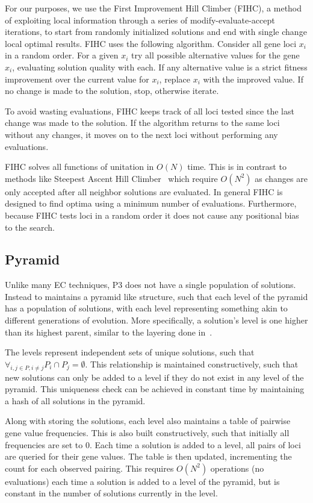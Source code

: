 \documentclass{sig-alternate}
\begin{document}
For our purposes, we use the First Improvement Hill Climber (FIHC), a method of exploiting
local information through a series of modify-evaluate-accept iterations, to start
from randomly initialized solutions and end with single change local optimal results.
FIHC uses the following algorithm.  Consider all gene loci $x_i$ in a random order.
For a given $x_i$ try all possible alternative values for the gene $x_i$, evaluating
solution quality with each.  If any alternative value is a strict fitness improvement
over the current value for $x_i$, replace $x_i$ with the improved value.  If no
change is made to the solution, stop, otherwise iterate.

To avoid wasting evaluations, FIHC keeps track of all loci tested since the last
change was made to the solution.  If the algorithm returns to the same loci without
any changes, it moves on to the next loci without performing any evaluations.

FIHC solves all functions of unitation in $O(N)$ time.  This is in contrast to
methods like Steepest Ascent Hill Climber~\cite{bosman:2011:lsbbo, goldman:2012:ltga}
which require $O(N^2)$ as changes are only accepted after all neighbor solutions
are evaluated.  In general FIHC is designed to find optima using a minimum number
of evaluations.  Furthermore, because FIHC tests loci in a random order it does
not cause any positional bias to the search.


\subsection{Pyramid}
\label{sec-pyramid}
Unlike many EC techniques, P3 does not have a single population of solutions.
Instead to maintains a pyramid like structure, such that each level of the pyramid
has a population of solutions, with each level representing something akin to different
generations of evolution.  More specifically, a solution's level is one higher than
its highest parent, similar to the layering done in~\cite{hornby:2006:alps}.

The levels represent independent sets of unique solutions, such that
$\forall_{i, j \in P, i \neq j} P_i \cap P_j = \emptyset$.  This relationship
is maintained constructively, such that new solutions can only be added to a level
if they do not exist in any level of the pyramid.  This uniqueness check can be
achieved in constant time by maintaining a hash of all solutions in the pyramid.

Along with storing the solutions, each level also maintains a table of pairwise
gene value frequencies.  This is also built constructively, such that initially
all frequencies are set to 0.  Each time a solution is added to a level, all
pairs of loci are queried for their gene values.  The table is then updated,
incrementing the count for each observed pairing.  This requires $O(N^2)$ operations
(no evaluations) each time a solution is added to a level of the pyramid, but is
constant in the number of solutions currently in the level.
\end{document}
